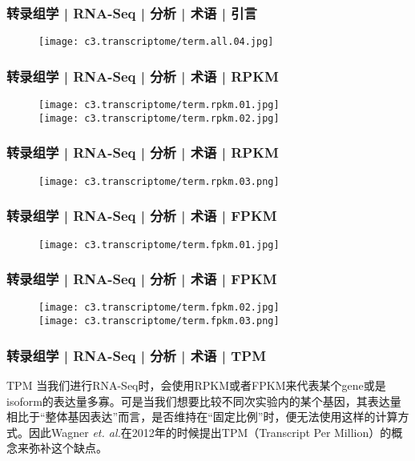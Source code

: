 \begin{frame}
  \frametitle{转录组学 | RNA-Seq | 分析 | 术语 | 引言}
  \begin{figure}
    \centering
    \texttt{[image: c3.transcriptome/term.all.04.jpg]}
  \end{figure}
\end{frame}

\begin{frame}
  \frametitle{转录组学 | RNA-Seq | 分析 | 术语 | RPKM}
  \begin{figure}
    \centering
    \texttt{[image: c3.transcriptome/term.rpkm.01.jpg]}\\
    \vspace{1em}
    \texttt{[image: c3.transcriptome/term.rpkm.02.jpg]}
  \end{figure}
\end{frame}

\begin{frame}
  \frametitle{转录组学 | RNA-Seq | 分析 | 术语 | RPKM}
  \begin{figure}
    \centering
    \texttt{[image: c3.transcriptome/term.rpkm.03.png]}
  \end{figure}
\end{frame}

\begin{frame}
  \frametitle{转录组学 | RNA-Seq | 分析 | 术语 | FPKM}
  \begin{figure}
    \centering
    \texttt{[image: c3.transcriptome/term.fpkm.01.jpg]}
  \end{figure}
\end{frame}

\begin{frame}
  \frametitle{转录组学 | RNA-Seq | 分析 | 术语 | FPKM}
  \begin{figure}
    \centering
    \texttt{[image: c3.transcriptome/term.fpkm.02.jpg]}\\
    \vspace{1em}
    \texttt{[image: c3.transcriptome/term.fpkm.03.png]}
  \end{figure}
\end{frame}

\begin{frame}
  \frametitle{转录组学 | RNA-Seq | 分析 | 术语 | TPM}
  \begin{block}{TPM}
    当我们进行RNA-Seq时，会使用RPKM或者FPKM来代表某个gene或是isoform的表达量多寡。可是当我们想要比较不同次实验内的某个基因，其表达量相比于“整体基因表达”而言，是否维持在“固定比例”时，便无法使用这样的计算方式。因此Wagner \textit{et. al.}在2012年的时候提出TPM（Transcript Per Million）的概念来弥补这个缺点。
  \end{block}
\end{frame}

